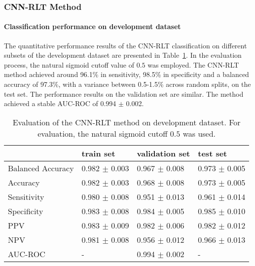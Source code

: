 \subsubsection{CNN-RLT Method}
\label{subsubsec:eval_rlt}


\paragraph{Classification performance on development dataset}

The quantitative performance results of the CNN-RLT classification on 
different subsets of the development dataset are presented in Table~\ref{t1:cnn_rlt_perf_eval_table}.
In the evaluation process, the natural sigmoid cutoff value of $0.5$ was employed.
The CNN-RLT method achieved around 96.1\% in sensitivity, 98.5\% in specificity and a balanced accuracy of 97.3\%, 
with a variance between 0.5-1.5\% across random splits, on the test set.
The performance results on the validation set are similar.
The method achieved a stable AUC-ROC of 0.994 $\pm$ 0.002.


\begin{table}[ht]
  \caption{Evaluation of the CNN-RLT method on development dataset. 
  For evaluation, the natural sigmoid cutoff $0.5$ was used.}
  \centering
  \begin{tabular}{llll}
      \hline
                        & train set         & validation set      & test set             \\
      \hline
      Balanced Accuracy & 0.982 $\pm$ 0.003   &  0.967 $\pm$ 0.008    &  0.973 $\pm$ 0.005  \\
      Accuracy          & 0.982 $\pm$ 0.003    &   0.968 $\pm$ 0.008   &  0.973 $\pm$ 0.005  \\
      Sensitivity       &  0.980 $\pm$ 0.008  &   0.951 $\pm$ 0.013  &  0.961 $\pm$ 0.014 \\
      Specificity       &   0.983 $\pm$ 0.008   &   0.984 $\pm$ 0.005  &   0.985 $\pm$ 0.010 \\
      PPV               &  0.983 $\pm$ 0.009   &   0.982 $\pm$ 0.006   &  0.982 $\pm$ 0.012   \\
      NPV               &  0.981 $\pm$ 0.008   &   0.956 $\pm$ 0.012   & 0.966 $\pm$ 0.013  \\
      \hline
      AUC-ROC          &  -                   & 0.994 $\pm$ 0.002 & -  \\
      \hline
  \end{tabular}
 \label{t1:cnn_rlt_perf_eval_table}
\end{table}


